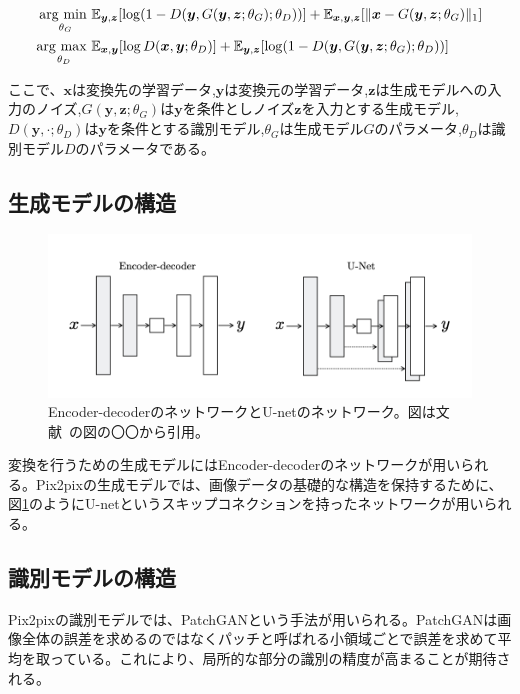 \begin{align}
    \label{eq:pix2pix_G}
    \mathop{\rm arg~min~}\limits _{\theta_G}& \mathbb{E}_{\boldsymbol{y}, \boldsymbol{z}}[\log (1-D(\boldsymbol{y}, G(\boldsymbol{y}, \boldsymbol{z}; \theta_G); \theta_D))]+\mathbb{E}_{\boldsymbol{x}, \boldsymbol{y}, \boldsymbol{z}}[\|\boldsymbol{x}-G(\boldsymbol{y}, \boldsymbol{z}; \theta_G)\|_{1}]\\
    \label{eq:pix2pix_D}
    \mathop{\rm arg~max~}\limits _{\theta_D}& \mathbb{E}_{\boldsymbol{x}, \boldsymbol{y}}[\log D(\boldsymbol{x}, \boldsymbol{y}; \theta_D)]+\mathbb{E}_{\boldsymbol{y}, \boldsymbol{z}}[\log (1-D(\boldsymbol{y}, G(\boldsymbol{y}, \boldsymbol{z}; \theta_G); \theta_D))]
\end{align}


ここで、$\boldsymbol{x}$は変換先の学習データ,$\boldsymbol{y}$は変換元の学習データ,$\boldsymbol{z}$は生成モデルへの入力のノイズ,$G(\boldsymbol{y},\boldsymbol{z};\theta_G)$は$\boldsymbol{y}$を条件としノイズ$\boldsymbol{z}$を入力とする生成モデル,$D(\boldsymbol{y},\cdot;\theta_D)$は$\boldsymbol{y}$を条件とする識別モデル,$\theta_G$は生成モデル$G$のパラメータ,$\theta_D$は識別モデル$D$のパラメータである。

\subsection{生成モデルの構造}

\begin{figure}[t]
\begin{center}
\includegraphics[width=\hsize]{figure/u-net.png}
\caption{Encoder-decoderのネットワークとU-netのネットワーク。図は文献~\cite{u-net}の図の〇〇から引用。}
\label{fig:u-net}
\end{center}
\end{figure}


変換を行うための生成モデルにはEncoder-decoderのネットワークが用いられる。Pix2pixの生成モデルでは、画像データの基礎的な構造を保持するために、図\ref{fig:u-net}のようにU-net\cite{u-net}というスキップコネクションを持ったネットワークが用いられる。

\subsection{識別モデルの構造}


Pix2pixの識別モデルでは、PatchGANという手法が用いられる。PatchGANは画像全体の誤差を求めるのではなくパッチと呼ばれる小領域ごとで誤差を求めて平均を取っている。これにより、局所的な部分の識別の精度が高まることが期待される。

